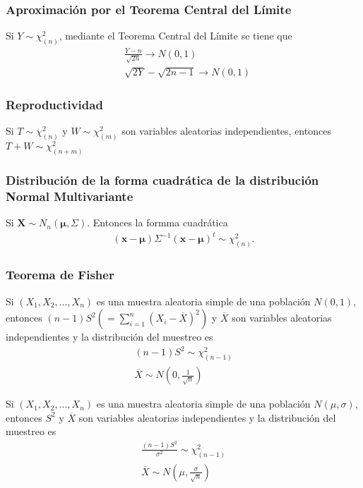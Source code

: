 \subsubsection{Aproximación por el Teorema Central del Límite}
Si $Y \sim \chi_{(n)}^2$, mediante el Teorema Central del Límite se tiene que
\begin{align*}
    &\frac{Y - n}{\sqrt{2n}} \longrightarrow N(0,1) \\
    &\sqrt{2Y} - \sqrt{2n - 1} \longrightarrow N(0,1)
\end{align*}

\subsubsection{Reproductividad}
Si $T \sim \chi_{(n)}^2$ y $W \sim \chi_{(m)}^2$ son variables aleatorias independientes, entonces $T + W \sim \chi_{(n+m)}^2$

\subsubsection{Distribución de la forma cuadrática de la distribución Normal Multivariante}
Si $\textbf{X} \sim N_n(\boldsymbol{\mu}, \Sigma)$. Entonces la formma cuadrática
\begin{align*}
    (\textbf{x} - \boldsymbol{\mu})\Sigma^{-1}(\textbf{x} - \boldsymbol{\mu})^t \sim \chi_{(n)}^2.
\end{align*}

\subsubsection{Teorema de Fisher}

\begin{teo}
Si $(X_1,X_2,...,X_n)$ es una muestra aleatoria simple de una población $N(0,1)$, entonces $(n-1)S^2 \left( = \sum_{i=1}^{n}{(X_i -\overline{X})^2}\right)$ y $\overline{X}$ son variables aleatorias independientes y la distribución del muestreo es
\begin{align*}
    (n-1)S^2 \sim \chi_{(n-1)}^2 \\
    \overline{X} \sim N\left( 0, \frac{1}{\sqrt{n}} \right)
\end{align*}
\end{teo}

\begin{teo}
Si $(X_1,X_2,...,X_n)$ es una muestra aleatoria simple de una población $N(\mu,\sigma)$, entonces $S^2$ y $\overline{X}$ son variables aleatorias independientes y la distribución del muestreo es
\begin{align*}
    \frac{(n-1)S^2}{\sigma^2} \sim \chi_{(n-1)}^2 \\
    \overline{X} \sim N\left( \mu, \frac{\sigma}{\sqrt{n}} \right)
\end{align*}
\end{teo}

